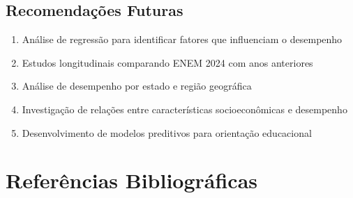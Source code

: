 \documentclass[12pt,a4paper]{article}
\begin{document}
\subsection{Recomendações Futuras}

\begin{enumerate}
    \item Análise de regressão para identificar fatores que influenciam o desempenho
    \item Estudos longitudinais comparando ENEM 2024 com anos anteriores
    \item Análise de desempenho por estado e região geográfica
    \item Investigação de relações entre características socioeconômicas e desempenho
    \item Desenvolvimento de modelos preditivos para orientação educacional
\end{enumerate}

\newpage

\section{Referências Bibliográficas}
\end{document}
